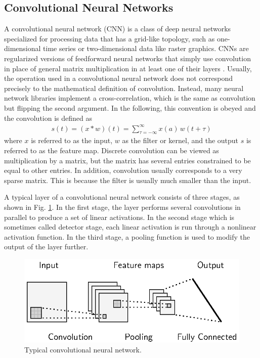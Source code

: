 \documentclass{scrartcl}
\begin{document}
\subsection{Convolutional Neural Networks}

A convolutional neural network (CNN) \cite{LeCun1989} is a class of deep neural networks specialized for processing data that has a grid-like topology, such as one-dimensional time series or two-dimensional data like raster graphics. CNNs are regularized versions of feedforward neural networks that simply use convolution in place of general matrix multiplication in at least one of their layers \cite{Goodfellow2016}. Usually, the operation used in a convolutional neural network does not correspond precisely to the mathematical definition of convolution. Instead, many neural network libraries implement a cross-correlation, which is the same as convolution but flipping the second argument. In the following, this convention is obeyed and the convolution is defined as
\begin{align}
s(t) = (x * w)(t) = \sum_{\tau=-\infty}^{\infty} x(a)\,w(t+\tau)
\end{align} 
where $x$ is referred to as the input, $w$ as the filter or kernel, and the output $s$ is referred to as the feature map. Discrete convolution can be viewed as multiplication by a matrix, but the matrix has several entries constrained to be equal to other entries. In addition, convolution usually corresponds to a very sparse matrix. This is because the filter is usually much smaller than the input. 

A typical layer of a convolutional neural network consists of three stages, as shown in Fig. \ref{fig:typical_cnn}. In the first stage, the layer performs several convolutions in parallel to produce a set of linear activations. In the second stage which is sometimes called detector stage, each linear activation is run through a nonlinear activation function. In the third stage, a pooling function is used to modify the output of the layer further. 

\begin{figure}[htbp]
\centering
\includegraphics[scale=1]{figures/cnn.eps}
\caption{Typical convolutional neural network. }
\label{fig:typical_cnn}
\end{figure}
\end{document}
